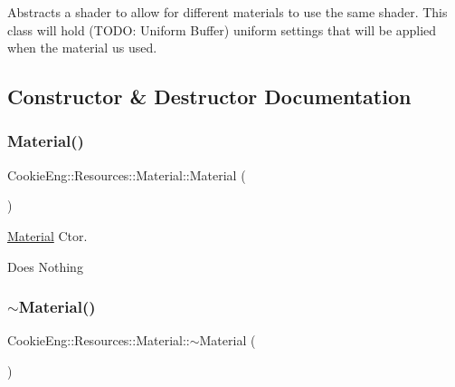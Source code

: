 Abstracts a shader to allow for different materials to use the same shader. This class will hold (T\+O\+DO\+: Uniform Buffer) uniform settings that will be applied when the material us used. 

\subsection{Constructor \& Destructor Documentation}
\mbox{\label{class_cookie_eng_1_1_resources_1_1_material_a20a77072223e5948a5842aa71cf04eff}} 
\subsubsection{\texorpdfstring{Material()}{Material()}}
{\footnotesize\ttfamily Cookie\+Eng\+::\+Resources\+::\+Material\+::\+Material (\begin{DoxyParamCaption}{ }\end{DoxyParamCaption})\hspace{0.3cm}{\ttfamily [inline]}}



\hyperlink{class_cookie_eng_1_1_resources_1_1_material}{Material} Ctor. 

Does Nothing \mbox{\label{class_cookie_eng_1_1_resources_1_1_material_aa2fb7a1c6a22e6e3a4271ad4aca8f0a6}} 
\subsubsection{\texorpdfstring{$\sim$\+Material()}{~Material()}}
{\footnotesize\ttfamily Cookie\+Eng\+::\+Resources\+::\+Material\+::$\sim$\+Material (\begin{DoxyParamCaption}{ }\end{DoxyParamCaption})\hspace{0.3cm}{\ttfamily [inline]}}



